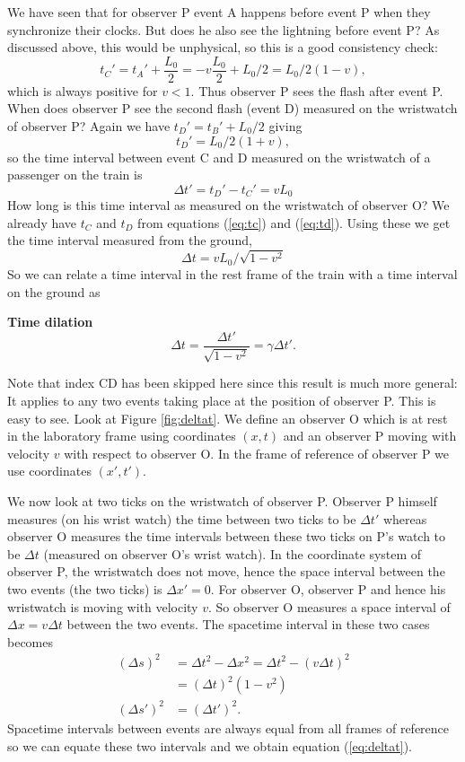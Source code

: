 {\begin{multicols}{2}
We have seen that for observer P event A happens before event P when they synchronize their clocks. But does he also see the lightning before event P? As discussed above, this would be unphysical, so this is a good consistency check:
\[
t_C'=t_A'+\frac{L_0}{2}=-v\frac{L_0}{2}+L_0/2=L_0/2(1-v),
\]
which is always positive for $v<1$. Thus observer P sees the flash after event P. When does observer P see the second flash (event D) measured on the wristwatch of observer P? Again we have $t_D'=t_B'+L_0/2$ giving
\[
t_D'=L_0/2(1+v),
\]
so the time interval between event C and D measured on the wristwatch of a passenger on the train is
\[
\Delta t'=t_D'-t_C'=vL_0
\]
How long is this time interval as measured on the wristwatch of observer O? We already have $t_C$ and $t_D$ from equations (\ref{eq:tc}) and (\ref{eq:td}). Using these we get the time interval measured from the ground,
\[
\Delta t=vL_0/\sqrt{1-v^2}
\]
So we can relate a time interval in the rest frame of the train with a time interval on the ground as
\begin{formbox}
\textbf{Time dilation}
\begin{equation}
\label{eq:deltat}
\Delta t=\frac{\Delta t'}{\sqrt{1-v^2}}=\gamma \Delta t'.
\end{equation}
\end{formbox}
Note that index CD has been skipped here since this result is much more general: It applies to any two events taking place at the position of observer P. This is easy to see. Look at Figure \ref{fig:deltat}. We define an observer O which is at rest in the laboratory frame using coordinates $(x,t)$ and an observer P moving with velocity $v$ with respect to observer O. In the frame of reference of observer P we use coordinates $(x',t')$. 

We now look at two ticks on the wristwatch of observer P. Observer P himself measures (on his wrist watch) the time between two ticks to be $\Delta t'$ whereas observer O measures the time intervals between these two ticks on P's watch to be $\Delta t$ (measured on observer O's wrist watch). In the coordinate system of observer P, the wristwatch does not move, hence the space interval between the two events (the two ticks) is $\Delta x'=0$. For observer O, observer P and hence his wristwatch is moving with velocity $v$. So observer O measures a space interval of $\Delta x=v\Delta t$ between the two events. The spacetime interval in these two cases becomes
\begin{align*}
(\Delta s)^2&=\Delta t^2-\Delta x^2=\Delta t^2-(v\Delta t)^2\\
&=(\Delta t)^2(1-v^2)\\
(\Delta s')^2&=(\Delta t')^2.
\end{align*}
Spacetime intervals between events are always equal from all frames of reference so we can equate these two intervals and we obtain equation (\ref{eq:deltat}).


\end{multicols}}
